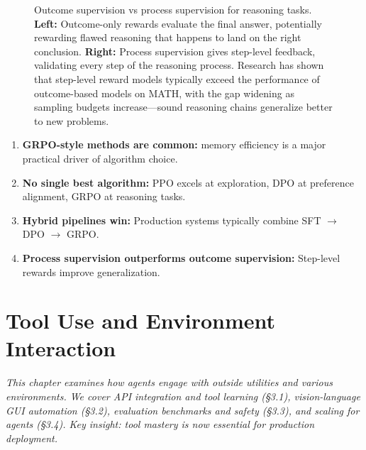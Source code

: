 \documentclass[12pt,a4paper]{report}
\theoremstyle{definition}
\begin{document}
\begin{figure}[htbp]
\caption{Outcome supervision vs process supervision for reasoning tasks. \textbf{Left:} Outcome-only rewards evaluate the final answer, potentially rewarding flawed reasoning that happens to land on the right conclusion. \textbf{Right:} Process supervision gives step-level feedback, validating every step of the reasoning process.
 Research has shown that step-level reward models typically exceed the performance of outcome-based models on MATH, with the gap widening as sampling budgets increase---sound reasoning chains generalize better to new problems.
}
\label{fig:process_supervision}
\end{figure}

\begin{tcolorbox}[colback=blue!5!white, colframe=blue!75!black, title=\textbf{Chapter 2 Key Takeaways}]
\begin{enumerate}
    \item \textbf{GRPO-style methods are common:} memory efficiency is a major practical driver of algorithm choice.
    \item \textbf{No single best algorithm:} PPO excels at exploration, DPO at preference alignment, GRPO at reasoning tasks.
    \item \textbf{Hybrid pipelines win:} Production systems typically combine SFT $\rightarrow$ DPO $\rightarrow$ GRPO.
    \item \textbf{Process supervision outperforms outcome supervision:} Step-level rewards improve generalization.
\end{enumerate}
\end{tcolorbox}

\chapter{Tool Use and Environment Interaction}
\label{ch:tooluse}

\textit{This chapter examines how agents engage with outside utilities and various environments.
 We cover API integration and tool learning (\S3.1), vision-language GUI automation (\S3.2), evaluation benchmarks and safety (\S3.3), and scaling for agents (\S3.4). Key insight: tool mastery is now essential for production deployment.}
\end{document}
